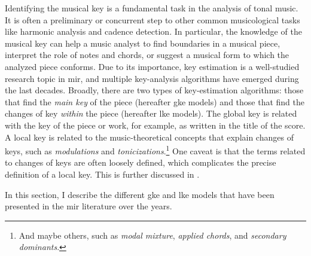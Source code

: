 

Identifying the musical key is a fundamental task in the
analysis of tonal music. It is often a preliminary or
concurrent step to other common musicological tasks like
harmonic analysis and cadence detection. In particular, the
knowledge of the musical key can help a music analyst to
find boundaries in a musical piece, interpret the role of
notes and chords, or suggest a musical form to which the
analyzed piece conforms. Due to its importance, key
estimation is a well-studied research topic in \gls{mir},
and multiple key-analysis algorithms have emerged during the
last decades. Broadly, there are two types of key-estimation
algorithms: those that find the \emph{main key} of the piece
(hereafter \gls{gke} models) and those that find the changes
of key \emph{within} the piece (hereafter \gls{lke} models).
The global key is related with the key of the piece or work,
for example, as written in the title of the score.
A local key is related to the music-theoretical concepts
that explain changes of keys, such as \emph{modulations} and
\emph{tonicizations}.\footnote{And maybe others, such as
\emph{modal mixture}, \emph{applied chords}, and
\emph{secondary dominants}.} One caveat is that the terms
related to changes of keys are often loosely defined, which
complicates the precise definition of a local key. This is
further discussed in .

In this section, I describe the different \gls{gke} and
\gls{lke} models that have been presented in the \gls{mir}
literature over the years.
